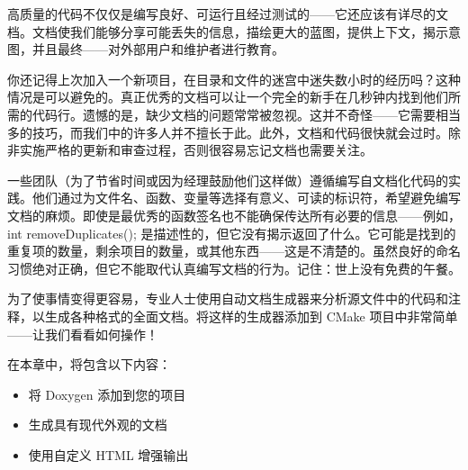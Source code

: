 高质量的代码不仅仅是编写良好、可运行且经过测试的——它还应该有详尽的文档。文档使我们能够分享可能丢失的信息，描绘更大的蓝图，提供上下文，揭示意图，并且最终——对外部用户和维护者进行教育。

你还记得上次加入一个新项目，在目录和文件的迷宫中迷失数小时的经历吗？这种情况是可以避免的。真正优秀的文档可以让一个完全的新手在几秒钟内找到他们所需的代码行。遗憾的是，缺少文档的问题常常被忽视。这并不奇怪——它需要相当多的技巧，而我们中的许多人并不擅长于此。此外，文档和代码很快就会过时。除非实施严格的更新和审查过程，否则很容易忘记文档也需要关注。

一些团队（为了节省时间或因为经理鼓励他们这样做）遵循编写自文档化代码的实践。他们通过为文件名、函数、变量等选择有意义、可读的标识符，希望避免编写文档的麻烦。即使是最优秀的函数签名也不能确保传达所有必要的信息——例如，int removeDuplicates(); 是描述性的，但它没有揭示返回了什么。它可能是找到的重复项的数量，剩余项目的数量，或其他东西——这是不清楚的。虽然良好的命名习惯绝对正确，但它不能取代认真编写文档的行为。记住：世上没有免费的午餐。

为了使事情变得更容易，专业人士使用自动文档生成器来分析源文件中的代码和注释，以生成各种格式的全面文档。将这样的生成器添加到 CMake 项目中非常简单——让我们看看如何操作！

在本章中，将包含以下内容：

\begin{itemize}
\item
将 Doxygen 添加到您的项目

\item
生成具有现代外观的文档

\item
使用自定义 HTML 增强输出
\end{itemize}